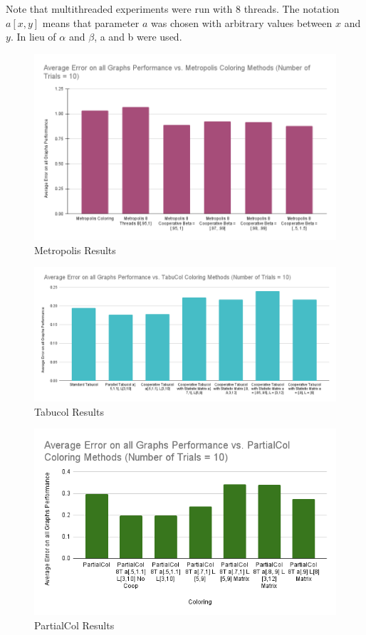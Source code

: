 \documentclass[runningheads]{llncs}
\begin{document}
Note that multithreaded experiments were run with 8 threads. The notation $a[x,y]$ means that parameter $a$ was chosen with arbitrary values between $x$ and $y$. In lieu of $\alpha$ and $\beta$, a and b were used.

\begin{figure}[h]
  \centering
  \includegraphics[width=1.125\textwidth]{Metropolis.png}
  \caption{Metropolis Results}
  \label{fig:metr1}
\end{figure}

\begin{figure}[h]
  \centering
  \includegraphics[width=1\textwidth]{Tabucol.png}
  \caption{Tabucol Results}
  \label{fig:TabuColl}
\end{figure}


\begin{figure}[h]
  \centering
  \includegraphics[width=1\textwidth]{PartialCol.png}
  \caption{PartialCol Results}
  \label{fig:partialcol}
\end{figure}
\end{document}
